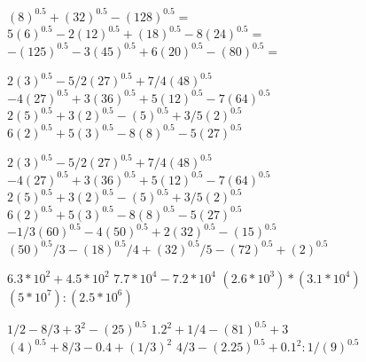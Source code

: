 \documentclass[12pt]{article}
\begin{document}
$(8)^0.5 + (32)^0.5 - (128)^0.5 =$
$5(6)^0.5 - 2(12)^0.5 + (18)^0.5 - 8(24)^0.5 =$
$-(125)^0.5 - 3(45)^0.5 + 6(20)^0.5 - (80)^0.5 =$

$2(3)^0.5 - 5/2(27)^0.5 + 7/4(48)^0.5$
$-4(27)^0.5 + 3(36)^0.5 + 5(12)^0.5 - 7(64)^0.5$
$2(5)^0.5 + 3(2)^0.5 - (5)^0.5 + 3/5(2)^0.5$
$6(2)^0.5 + 5(3)^0.5 - 8(8)^0.5 - 5(27)^0.5$

$2(3)^0.5 - 5/2(27)^0.5 + 7/4(48)^0.5$
$-4(27)^0.5 + 3(36)^0.5 + 5(12)^0.5 - 7(64)^0.5$
$2(5)^0.5 + 3(2)^0.5 - (5)^0.5 + 3/5(2)^0.5$
$6(2)^0.5 + 5(3)^0.5 - 8(8)^0.5 - 5(27)^0.5$
$-1/3(60)^0.5 - 4(50)^0.5 + 2(32)^0.5 - (15)^0.5$
$(50)^0.5/3 - (18)^0.5/4 + (32)^0.5/5 - (72)^0.5 + (2)^0.5$

$6.3*10^2 + 4.5*10^2$
$7.7*10^4 - 7.2*10^4$
$(2.6*10^3)*(3.1*10^4)$
$(5*10^7):(2.5*10^6)$

$1/2 - 8/3 +3^2 - (25)^0.5$
$1.2^2 + 1/4 - (81)^0.5 + 3$
$(4)^0.5 + 8/3 - 0.4 + (1/3)^2$
$4/3 - (2.25)^0.5 + 0.1^2:1/(9)^0.5$
\end{document}
